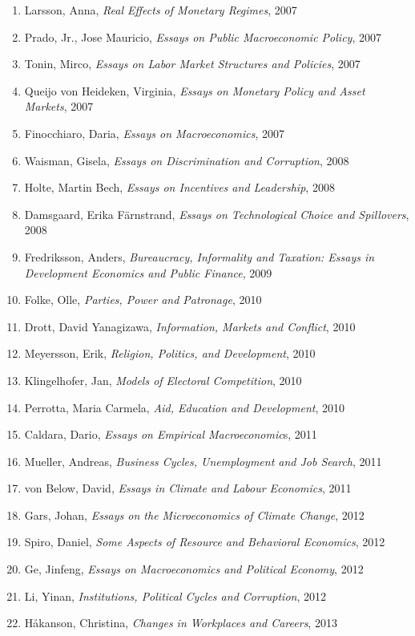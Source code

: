 \begin{spacing}{.5}
\begin{enumerate}
{Education, Health and Gender}, 2006
\item Larsson, Anna,\emph{ Real Effects of Monetary Regimes}, 2007
\item Prado, Jr., Jose Mauricio,\emph{ Essays on Public Macroeconomic Policy},
2007
\item Tonin, Mirco,\emph{ Essays on Labor Market Structures and Policies},
2007
\item Queijo von Heideken, Virginia,\emph{ Essays on Monetary Policy and
Asset Markets}, 2007
\item Finocchiaro, Daria,\emph{ Essays on Macroeconomics}, 2007
\item Waisman, Gisela,\emph{ Essays on Discrimination and Corruption}, 2008
\item Holte, Martin Bech,\emph{ Essays on Incentives and Leadership}, 2008
\item Damsgaard, Erika F\"arnstrand,\emph{ Essays on Technological Choice
and Spillovers}, 2008
\item Fredriksson, Anders, \emph{Bureaucracy, Informality and Taxation:
Essays in Development Economics and Public Finance}, 2009
\item Folke, Olle, \emph{Parties, Power and Patronage}, 2010
\item Drott, David Yanagizawa, \emph{Information, Markets and Conflict},
2010
\item Meyersson, Erik, \emph{Religion, Politics, and Development}, 2010
\item Klingelhofer, Jan, \emph{Models of Electoral Competition}, 2010
\item Perrotta, Maria Carmela, \emph{Aid, Education and Development}, 2010
\item Caldara, Dario, \emph{Essays on Empirical Macroeconomic}s, 2011
\item Mueller, Andreas, \emph{Business Cycles, Unemployment and Job Search},
2011
\item von Below, David, \emph{Essays in Climate and Labour Economics}, 2011
\item Gars, Johan, \emph{Essays on the Microeconomics of Climate Change},
2012
\item Spiro, Daniel, \emph{Some Aspects of Resource and Behavioral Economics},
2012
\item Ge, Jinfeng, \emph{Essays on Macroeconomics and Political Economy},
2012
\item Li, Yinan, \emph{Institutions, Political Cycles and Corruption}, 2012
\item H\aa kanson, Christina, \emph{Changes in Workplaces and Careers}, 2013

\end{enumerate}
\end{spacing}
